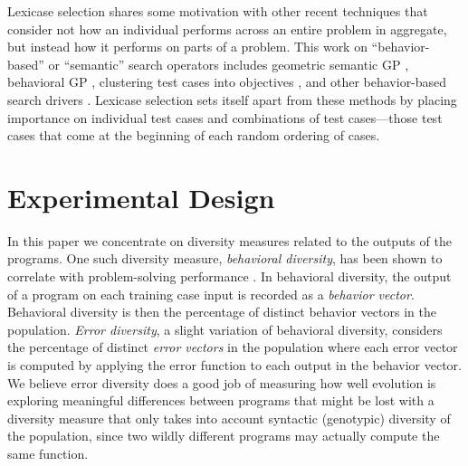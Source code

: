 \documentclass{sig-alternate-05-2015}
\begin{document}
Lexicase selection shares some motivation with other recent techniques that consider not how an individual performs across an entire problem in aggregate, but instead how it performs on parts of a problem. This work on ``behavior-based'' or ``semantic'' search operators includes geometric semantic GP \cite{Moraglio2012}, behavioral GP \cite{Krawiec:2014:GECCO}, clustering test cases into objectives \cite{Krawiec:2015:EuroGP, Krawiec:2015:GECCO:smgpWorkshop}, and other behavior-based search drivers \cite{Krawiec:2015:GPTP}. Lexicase selection sets itself apart from these methods by placing importance on individual test cases and combinations of test cases---those test cases that come at the beginning of each random ordering of cases.


\section{Experimental Design}

In this paper we concentrate on diversity measures related to the outputs of the programs. One such diversity measure, \textit{behavioral diversity}, has been shown to correlate with problem-solving performance \cite{Jackson:2010:PPSN}. In behavioral diversity, the output of a program on each training case input is recorded as a \textit{behavior vector}. Behavioral diversity is then the percentage of distinct behavior vectors in the population. \textit{Error diversity}, a slight variation of behavioral diversity, considers the percentage of distinct \textit{error vectors} in the population where each error vector is computed by applying the error function to each output in the behavior vector. We believe error diversity does a good job of measuring how well evolution is exploring meaningful differences between programs that might be lost with a diversity measure that only takes into account syntactic (genotypic) diversity of the population, since two wildly different programs may actually compute the same function.
\end{document}
